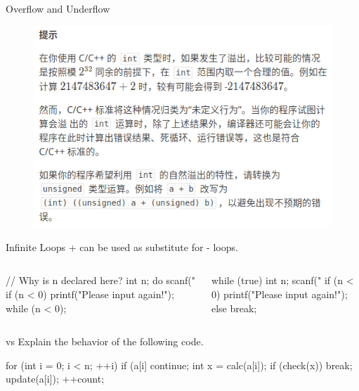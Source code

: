 \documentclass{beamer}
\begin{document}
\begin{frame}{Overflow and Underflow}
    \begin{figure}[h]
        \centering
        \includegraphics[scale = 0.5]{figures/from-luogu.png}
    \end{figure}
\end{frame}

\begin{frame}[fragile]{Infinite Loops}
     +  can be used as substitute for - loops.
    \begin{columns}
        \begin{cpp}
// Why is n declared here?
int n;
do {
  scanf("%
  if (n < 0)
    printf("Please input again!\n");
} while (n < 0);
        \end{cpp}
        \begin{cpp}
while (true) {
  int n;
  scanf("%
  if (n < 0)
    printf("Please input again!\n");
  else
    break;
}
        \end{cpp}
    \end{columns}
\end{frame}

\begin{frame}[fragile]{ vs }
    Explain the behavior of the following code.
    \begin{cpp}
for (int i = 0; i < n; ++i) {
  if (a[i] %
    continue;
  int x = calc(a[i]);
  if (check(x))
    break;
  update(a[i]);
  ++count;
}
    \end{cpp}
\end{frame}
\end{document}
